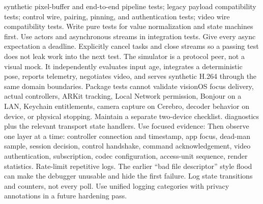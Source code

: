 \markdownRendererUlItem synthetic pixel-buffer and end-to-end pipeline tests;\markdownRendererUlItemEnd 
\markdownRendererUlItem legacy payload compatibility tests;\markdownRendererUlItemEnd 
\markdownRendererUlItem control wire, pairing, pinning, and authentication tests;\markdownRendererUlItemEnd 
\markdownRendererUlItem video wire compatibility tests.\markdownRendererUlItemEnd 
\markdownRendererUlEnd \markdownRendererInterblockSeparator
{}Write pure tests for value normalization and state machines first. Use actors and asynchronous streams in integration tests. Give every async expectation a deadline. Explicitly cancel tasks and close streams so a passing test does not leak work into the next test.\markdownRendererParagraphSeparator
{}The simulator is a protocol peer, not a visual mock. It independently evaluates input age, integrates a deterministic pose, reports telemetry, negotiates video, and serves synthetic H.264 through the same domain boundaries.\markdownRendererParagraphSeparator
{}Package tests cannot validate visionOS focus delivery, actual controllers, ARKit tracking, Local Network permission, Bonjour on a LAN, Keychain entitlements, camera capture on Cerebro, decoder behavior on device, or physical stopping. Maintain a separate two-device checklist.\markdownRendererInterblockSeparator
{}
\markdownRendererSectionEnd \markdownRendererSectionBegin
{}\markdownRendererInterblockSeparator
{}\markdownRendererBlockQuoteBegin
{}  diagnostics plus the relevant transport state handlers.\markdownRendererBlockQuoteEnd \markdownRendererInterblockSeparator
{}Use focused evidence:\markdownRendererInterblockSeparator
{}\markdownRendererInterblockSeparator
{}Then observe one layer at a time: controller connection and timestamp, app focus, dead-man sample, session decision, control handshake, command acknowledgement, video authentication, subscription, codec configuration, access-unit sequence, render statistics.\markdownRendererParagraphSeparator
{}Rate-limit repetitive logs. The earlier “bad file descriptor” style flood can make the debugger unusable and hide the first failure. Log state transitions and counters, not every poll. Use unified logging categories with privacy annotations in a future hardening pass.\markdownRendererInterblockSeparator
